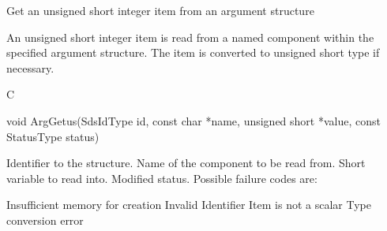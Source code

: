 \begin{manroutinedescription}
      Get an unsigned short integer item from an argument structure

      An unsigned short integer item is read from a named component within the
      specified argument structure. The item is converted to unsigned short
      type if necessary.
 
      C

      void ArgGetus(SdsIdType id, const char *name, unsigned short *value, %
const StatusType {\mantt{*}} status)
 
\begin{manparametertable}
 Identifier to the structure.
 Name of the component to be read %
from.
  Short variable to %
read into.
 Modified status. Possible %
failure codes are:
\end{manparametertable}
\begin{mantwocolumntable}
Insufficient memory for creation
Invalid Identifier
Item is not a scalar
Type conversion error
\end{mantwocolumntable}
\end{manroutinedescription}
